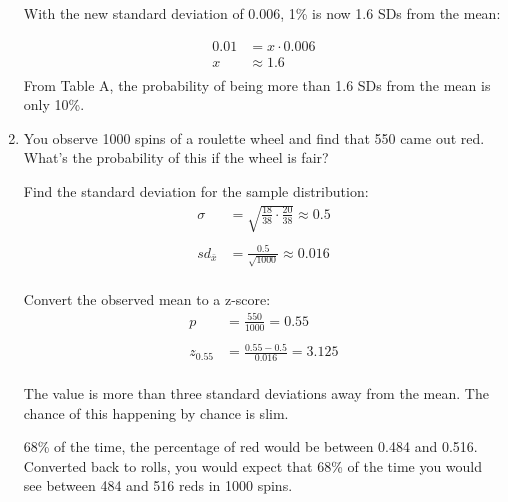 \documentclass[portrait]{exam}
\begin{document}
\begin{enumerate}
\begin{solution}
        With the new standard deviation of 0.006, 1\% is now 1.6 SDs from the
        mean: 
        
        \begin{align*}
          0.01 & = x \cdot 0.006 \\
          x   & \approx 1.6 \\
        \end{align*}
        From Table A, the probability of being more than 1.6 SDs from the mean
        is only 10\%.

      \end{solution}

    \item You observe 1000 spins of a roulette wheel and find that 550 came out
      red. What's the probability of this if the wheel is fair?

      \begin{solution}
        Find the standard deviation for the sample distribution:
        \begin{align*}
          \sigma & = \sqrt{\frac{18}{38} \cdot \frac{20}{38}} \approx 0.5 \\
          \\
          sd_{\bar{x}} & = \frac{0.5}{\sqrt{1000}} \approx 0.016 \\
        \end{align*}

        Convert the observed mean to a z-score:
        \begin{align*}
          p        & = \frac{550}{1000} = 0.55 \\
          \\
          z_{0.55} & = \frac{0.55 - 0.5}{0.016} = 3.125 \\
        \end{align*}

        The value is more than three standard deviations away from the mean. The
        chance of this happening by chance is slim.

        68\% of the time, the percentage of red would be between 0.484 and
        0.516. Converted back to rolls, you would expect that 68\% of the time
        you would see between 484 and 516 reds in 1000 spins.

      \end{solution}
  \end{enumerate}
\end{document}
